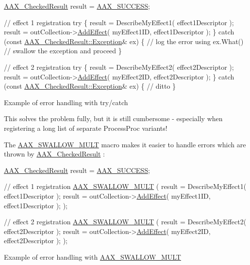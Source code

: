 \begin{DoxyCode}
\hyperlink{a00019}{AAX\_CheckedResult} result = \hyperlink{a00207_a5f8c7439f3a706c4f8315a9609811937aeddbd1bb67e3a66e6af54a4b4a7a57b3}{AAX\_SUCCESS};

\textcolor{comment}{// effect 1 registration}
\textcolor{keywordflow}{try} \{
  result = DescribeMyEffect1( effect1Descriptor );
  result = outCollection->\hyperlink{a00087_a5ff114b8c4da2081515186f2faf65c8c}{AddEffect}( myEffect1ID, effect1Descriptor );
\}
\textcolor{keywordflow}{catch} (\textcolor{keyword}{const} \hyperlink{a00147}{AAX\_CheckedResult::Exception}& ex) \{
  \textcolor{comment}{// log the error using ex.What()}
  \textcolor{comment}{// swallow the exception and proceed}
\}

\textcolor{comment}{// effect 2 registration}
\textcolor{keywordflow}{try} \{
  result = DescribeMyEffect2( effect2Descriptor );
  result = outCollection->\hyperlink{a00087_a5ff114b8c4da2081515186f2faf65c8c}{AddEffect}( myEffect2ID, effect2Descriptor );
\}
\textcolor{keywordflow}{catch} (\textcolor{keyword}{const} \hyperlink{a00147}{AAX\_CheckedResult::Exception}& ex) \{
  \textcolor{comment}{// ditto}
\}
\end{DoxyCode}
 Example of error handling with try/catch

 This solves the problem fully, but it is still cumbersome -\/ especially when registering a long list of separate Process\+Proc variants!

 The \hyperlink{a00208_aef6db72a3774d079609f94720928cdd6}{A\+A\+X\+\_\+\+S\+W\+A\+L\+L\+O\+W\+\_\+\+M\+U\+L\+T} macro makes it easier to handle errors which are thrown by \hyperlink{a00019}{A\+A\+X\+\_\+\+Checked\+Result} \+:


\begin{DoxyCode}
\hyperlink{a00019}{AAX\_CheckedResult} result = \hyperlink{a00207_a5f8c7439f3a706c4f8315a9609811937aeddbd1bb67e3a66e6af54a4b4a7a57b3}{AAX\_SUCCESS};

\textcolor{comment}{// effect 1 registration}
\hyperlink{a00208_aef6db72a3774d079609f94720928cdd6}{AAX\_SWALLOW\_MULT} (
  result = DescribeMyEffect1( effect1Descriptor );
  result = outCollection->\hyperlink{a00087_a5ff114b8c4da2081515186f2faf65c8c}{AddEffect}( myEffect1ID, effect1Descriptor );
);

\textcolor{comment}{// effect 2 registration}
\hyperlink{a00208_aef6db72a3774d079609f94720928cdd6}{AAX\_SWALLOW\_MULT} (
  result = DescribeMyEffect2( effect2Descriptor );
  result = outCollection->\hyperlink{a00087_a5ff114b8c4da2081515186f2faf65c8c}{AddEffect}( myEffect2ID, effect2Descriptor );
);
\end{DoxyCode}
 Example of error handling with \hyperlink{a00208_aef6db72a3774d079609f94720928cdd6}{A\+A\+X\+\_\+\+S\+W\+A\+L\+L\+O\+W\+\_\+\+M\+U\+L\+T}

